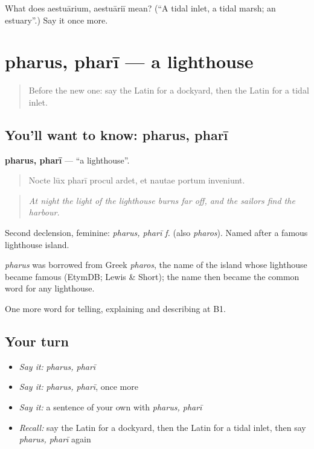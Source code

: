 \begin{tcolorbox}[breakable,colback=teal!4,colframe=teal!35!black,title={Before you move on}]
What does aestuārium, aestuāriī mean? (\textquotedblleft{}A tidal inlet, a tidal marsh; an estuary\textquotedblright{}.) Say it once more.
\end{tcolorbox}
\section[pharus, pharī]{pharus, pharī — a lighthouse}

\label{lesson:LA-C441-pharus}



\begin{quote}
Before the new one: say the Latin for a dockyard, then the Latin for a tidal inlet.
\end{quote}

\subsection*{You'll want to know: pharus, pharī}
\textbf{pharus, pharī} — \textquotedblleft{}a lighthouse\textquotedblright{}.

\begin{quote}
Nocte lūx pharī procul ardet, et nautae portum inveniunt.
\end{quote}

\begin{quote}
\emph{At night the light of the lighthouse burns far off, and the sailors find the harbour.}
\end{quote}

Second declension, feminine: \emph{pharus, pharī f.} (also \emph{pharos}). Named after a famous lighthouse island.

\begin{cousinweb}
\emph{pharus} was borrowed from Greek \emph{pharos}, the name of the island whose lighthouse became famous (EtymDB; Lewis \& Short); the name then became the common word for any lighthouse.
\end{cousinweb}

\begin{grammarlens}[title={What you've built}]
One more word for telling, explaining and describing at B1.
\end{grammarlens}

\subsection*{Your turn}
\begin{itemize}
\raggedright
  \item \emph{Say it:} \emph{pharus, pharī}
  \item \emph{Say it:} \emph{pharus, pharī}, once more
  \item \emph{Say it:} a sentence of your own with \emph{pharus, pharī}
  \item \emph{Recall:} say the Latin for a dockyard, then the Latin for a tidal inlet, then say \emph{pharus, pharī} again
\end{itemize}

